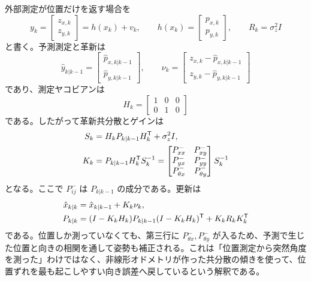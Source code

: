 \begin{example}
外部測定が位置だけを返す場合を
\begin{equation}
  y_k=
  \begin{bmatrix}
    z_{x,k}\\z_{y,k}
  \end{bmatrix}
  =
  h(x_k)+v_k,
  \qquad
  h(x_k)=
  \begin{bmatrix}
    p_{x,k}\\p_{y,k}
  \end{bmatrix},
  \qquad
  R_k=\sigma_z^2 I
\end{equation}
と書く。予測測定と革新は
\begin{equation}
  \hat{y}_{k|k-1}=
  \begin{bmatrix}
    \hat{p}_{x,k|k-1}\\
    \hat{p}_{y,k|k-1}
  \end{bmatrix},
  \qquad
  \nu_k=
  \begin{bmatrix}
    z_{x,k}-\hat{p}_{x,k|k-1}\\
    z_{y,k}-\hat{p}_{y,k|k-1}
  \end{bmatrix}
\end{equation}
であり、測定ヤコビアンは
\begin{equation}
  H_k=
  \begin{bmatrix}
    1&0&0\\
    0&1&0
  \end{bmatrix}
\end{equation}
である。したがって革新共分散とゲインは
\begin{align}
  S_k
  &=
  H_kP_{k|k-1}H_k^{\mathsf{T}}+\sigma_z^2I,\\
  K_k
  &=
  P_{k|k-1}H_k^{\mathsf{T}} S_k^{-1}
  =
  \begin{bmatrix}
    P^-_{xx}&P^-_{xy}\\
    P^-_{yx}&P^-_{yy}\\
    P^-_{\theta x}&P^-_{\theta y}
  \end{bmatrix}
  S_k^{-1}
\end{align}
となる。ここで $P^-_{ij}$ は $P_{k|k-1}$ の成分である。更新は
\begin{align}
  \hat{x}_{k|k}
  &=
  \hat{x}_{k|k-1}+K_k\nu_k,\\
  P_{k|k}
  &=
  (I-K_kH_k)P_{k|k-1}(I-K_kH_k)^{\mathsf{T}}
  +K_kR_kK_k^{\mathsf{T}}
\end{align}
である。位置しか測っていなくても、第三行に $P^-_{\theta x},P^-_{\theta y}$ が入るため、予測で生じた位置と向きの相関を通して姿勢も補正される。これは「位置測定から突然角度を測った」わけではなく、非線形オドメトリが作った共分散の傾きを使って、位置ずれを最も起こしやすい向き誤差へ戻しているという解釈である。


\end{example}

